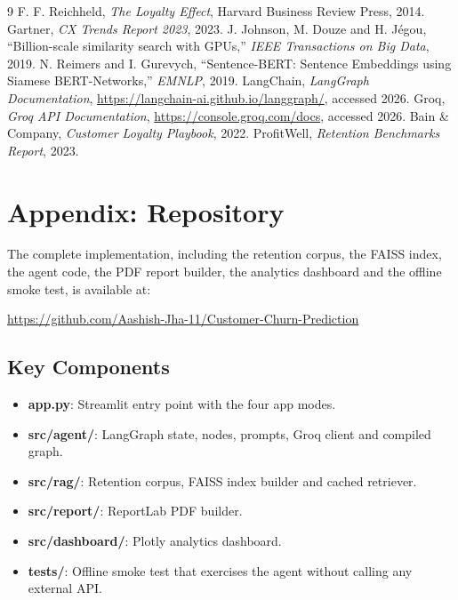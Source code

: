 \documentclass[conference]{IEEEtran}
\begin{document}
\begin{thebibliography}{9}
 F. F. Reichheld, \emph{The Loyalty Effect}, Harvard Business Review Press, 2014.
 Gartner, \emph{CX Trends Report 2023}, 2023.
 J. Johnson, M. Douze and H. J\'egou, ``Billion-scale similarity search with GPUs,'' \emph{IEEE Transactions on Big Data}, 2019.
 N. Reimers and I. Gurevych, ``Sentence-BERT: Sentence Embeddings using Siamese BERT-Networks,'' \emph{EMNLP}, 2019.
 LangChain, \emph{LangGraph Documentation}, \url{https://langchain-ai.github.io/langgraph/}, accessed 2026.
 Groq, \emph{Groq API Documentation}, \url{https://console.groq.com/docs}, accessed 2026.
 Bain \& Company, \emph{Customer Loyalty Playbook}, 2022.
 ProfitWell, \emph{Retention Benchmarks Report}, 2023.
\end{thebibliography}

\appendix

\section*{Appendix: Repository}
The complete implementation, including the retention corpus, the FAISS index, the agent code, the PDF report builder, the analytics dashboard and the offline smoke test, is available at:

\begin{center}
\url{https://github.com/Aashish-Jha-11/Customer-Churn-Prediction}
\end{center}

\subsection*{Key Components}
\begin{itemize}
    \item \textbf{app.py}: Streamlit entry point with the four app modes.
    \item \textbf{src/agent/}: LangGraph state, nodes, prompts, Groq client and compiled graph.
    \item \textbf{src/rag/}: Retention corpus, FAISS index builder and cached retriever.
    \item \textbf{src/report/}: ReportLab PDF builder.
    \item \textbf{src/dashboard/}: Plotly analytics dashboard.
    \item \textbf{tests/}: Offline smoke test that exercises the agent without calling any external API.
\end{itemize}
\end{document}
